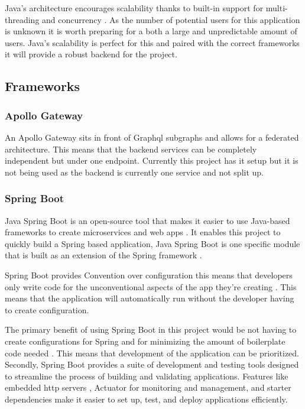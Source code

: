 \documentclass[]{project_report}
\begin{document}
Java's architecture encourages scalability thanks to built-in support for multi-threading and concurrency \cite{java}. As the number of potential users for this application is unknown it is worth preparing for a both a large and unpredictable amount of users. Java's scalability is perfect for this and paired with the correct frameworks it will provide a robust backend for the project.

\subsection{Frameworks}

\subsubsection{Apollo Gateway}

An Apollo Gateway sits in front of Graphql subgraphs and allows for a federated architecture. This means that the backend services can be completely independent but under one endpoint. Currently this project has it setup but it is not being used as the backend is currently one service and not split up.

\subsubsection{Spring Boot}

Java Spring Boot is an open-source tool that makes it easier to use Java-based frameworks to create microservices and web apps \cite{spring_boot}. It enables this project to quickly build a Spring based application, Java Spring Boot is one specific module that is built as an extension of the Spring framework \cite{spring_boot}. 

Spring Boot provides Convention over configuration \cite{spring_boot} this means that developers only write code for the unconventional aspects of the app they're creating \cite{spring_boot}. This means that the application will automatically run without the developer having to create configuration.

The primary benefit of using Spring Boot in this project would be not having to create configurations for Spring and for minimizing the amount of boilerplate code needed \cite{spring_boot}. This means that development of the application can be prioritized. Secondly, Spring Boot provides a suite of development and testing tools designed to streamline the process of building and validating applications. Features like embedded http servers \cite{spring_boot}, Actuator for monitoring and management, and starter dependencies make it easier to set up, test, and deploy applications efficiently.
\end{document}
